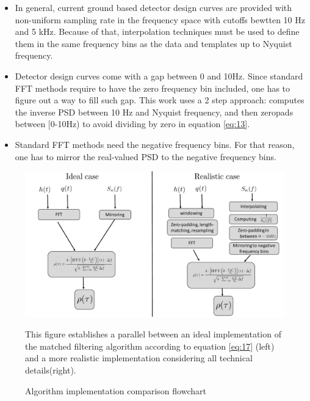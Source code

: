 \begin{itemize}
\begin{itemize}
	\item In general, current ground based detector design curves are provided with non-uniform sampling rate in the frequency space \cite{Reitze:2019dyk} with cutoffs bewtten 10 Hz and 5 kHz. Because of that, interpolation techniques must be used to define them in the same frequency bins as the data and templates up to Nyquist frequency.
	\item Detector design curves come with a gap between 0 and 10Hz. Since standard FFT methods require to have the zero frequency bin included, one has to figure out a way to fill such gap. This work uses a 2 step approach: computes the inverse PSD between 10 Hz and Nyquist frequency, and then zeropads between [0-10Hz) to avoid dividing by zero in equation \ref{eq:13}.
	\item Standard FFT methods need the negative frequency bins. For that reason, one has to mirror the real-valued PSD to the negative frequency bins.
	\end{itemize}

\end{itemize}

\begin{figure}[hbt!]

\begin{center}

\includegraphics[width=\textwidth, angle=0]{images/comparison.pdf}
\caption{Algorithm implementation comparison flowchart}
\label{fig:8}
\end{center}
This figure establishes a parallel between an ideal implementation of the matched filtering algorithm according to equation \ref{eq:17} (left) and a more realistic implementation considering all technical details(right).
\end{figure}

\FloatBarrier












